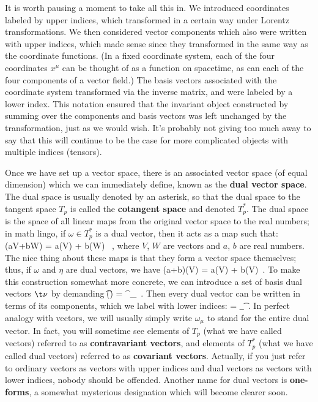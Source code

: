 It is worth pausing a moment to take all this in.  We introduced
coordinates labeled by upper indices, which transformed in a certain
way under Lorentz transformations.  We then considered vector components
which also were written with upper indices, which made sense since they
transformed in the same way as the coordinate functions.  (In a fixed
coordinate system, each of the four coordinates $x^\mu$ can be thought
of as a function on spacetime, as can each of the four components of
a vector field.)  The basis vectors associated with the coordinate
system transformed via the inverse matrix, and were labeled by a 
lower index.  This notation ensured that the invariant object constructed
by summing over the components and basis vectors was left unchanged by
the transformation, just as we would wish.  It's probably not giving too
much away to say that this will continue to be the case for more
complicated objects with multiple indices (tensors). 

Once we have set up a vector space, there is an associated vector space
(of equal dimension) which
we can immediately define, known as the {\bf dual vector space}.
The dual space is usually denoted by an asterisk, so that the dual 
space to the tangent space $T_p$ is called the {\bf cotangent space}
and denoted $T^*_p$.  The dual space is
the space of all linear maps from the original vector space to the real
numbers; in math lingo, if $\omega\in T_p^*$ is a dual vector, then it acts
as a map such that:
\be
  \omega(aV+bW) = a\omega(V) + b\omega(W) \ ,\label{1.31}
\ee
where $V$, $W$ are vectors and $a$, $b$ are real numbers.  The nice 
thing about these maps is that they form a vector space themselves; thus,
if $\omega$ and $\eta$ are dual vectors, we have
\be
  (a\omega+b\eta)(V) = a\omega(V) + b\eta(V)\ .\label{1.32}
\ee
To make this construction somewhat more concrete, we can introduce a
set of basis dual vectors $\t\nu$ by demanding
\be
  \t\nu(\e\mu) = \delta^\nu_\mu\ .\label{1.33}
\ee
Then every dual vector can be written in terms of its components, which
we label with lower indices:
\be
  \omega = \omega_\mu\t\mu\ .\label{1.34}
\ee
In perfect analogy with vectors, we will usually simply write
$\omega_\mu$ to stand for the entire dual vector.  In fact, you will
sometime see elements of $T_p$ (what we have called vectors) referred
to as {\bf contravariant vectors}, and elements of $T_p^*$ (what we
have called dual vectors) referred to as {\bf covariant vectors}.  Actually,
if you just refer to ordinary vectors as vectors with upper indices
and dual vectors as vectors with lower indices, nobody should be 
offended.  Another name for dual vectors is {\bf one-forms}, a somewhat
mysterious designation which will become clearer soon.

